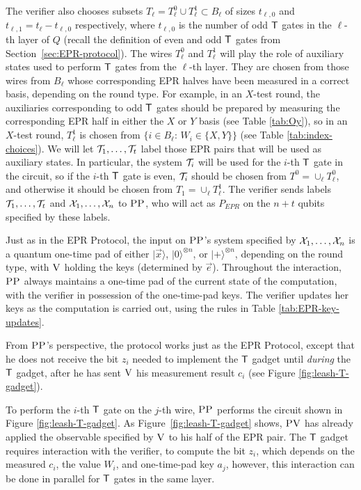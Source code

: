 \documentclass[11pt,letter]{article}
\theoremstyle{remark}
\theoremstyle{definition}
\newcommand{\ket}[1]{|#1\rangle}
\newcommand{\ver}{\textsc{V}}
\newcommand{\pv}{\textsc{PV}}
\newcommand{\pp}{\textsc{PP}}
\begin{document}
The verifier also chooses subsets $T_\ell = T_\ell^0 \cup T_\ell^1 \subset B_\ell$ of sizes $t_{\ell,0}$ and $t_{\ell,1} = t_\ell-t_{\ell,0}$ respectively, where $t_{\ell,0}$ is the number of odd $\sf T$ gates in the $\ell$-th layer of $Q$ (recall the definition of even and odd $\sf T$ gates from Section~\ref{sec:EPR-protocol}). The wires $T^0_\ell$ and $T^1_\ell$ will play the role of auxiliary states used to perform $\sf T$ gates from the $\ell$-th layer. They are chosen from those wires from $B_\ell$ whose corresponding EPR halves have been measured in a correct basis, depending on the round type.  For example, in an $X$-test round, the auxiliaries corresponding to odd $\sf T$ gates should be prepared by measuring the corresponding EPR half in either the $X$ or $Y$ basis (see Table \ref{tab:Oy}), so in an $X$-test round, $T_\ell^1$ is chosen from $\{i\in B_\ell:\,W_i\in \{X,Y\}\}$ (see Table \ref{tab:index-choices}). We will let ${\cal T}_1,\dots,{\cal T}_t$ label those EPR pairs that will be used as auxiliary states. In particular, the system ${\cal T}_i$ will be used for the $i$-th $\sf T$ gate in the circuit, so if the $i$-th $\sf T$ gate is even, ${\cal T}_i$ should be chosen from $T^0=\cup_\ell T_\ell^0$, and otherwise it should be chosen from $T_1=\cup_\ell T_\ell^1$. The verifier sends labels ${\cal T}_1,\dots,{\cal T}_t$ and ${\cal X}_1,\dots,{\cal X}_n$ to $\pp$, who will act as $P_{EPR}$ on the $n+t$ qubits specified by these labels.


Just as in the EPR Protocol, the input on $\pp$'s system specified by ${\cal X}_1,\dots,{\cal X}_n$ is a quantum one-time pad of either $\ket{\vec{x}}$, $\ket{0}^{\otimes n}$, or $\ket{+}^{\otimes n}$, depending on the round type, with $\ver$ holding the keys (determined by $\vec{e}$). Throughout the interaction, $\pp$ always maintains a one-time pad of the current state of the computation, with the verifier in possession of the one-time-pad keys. The verifier updates her keys as the computation is carried out, using the rules in Table \ref{tab:EPR-key-updates}. 




From $\pp$'s perspective, the protocol works just as the EPR Protocol, except that he does not receive the bit $z_i$ needed to implement the $\sf T$ gadget until \emph{during} the $\sf T$ gadget, after he has sent $\ver$ his measurement result $c_i$ (see Figure \ref{fig:leash-T-gadget}).


 
To perform the $i$-th $\sf T$ gate on the $j$-th wire, $\pp$ performs the circuit shown in Figure \ref{fig:leash-T-gadget}. As Figure~\ref{fig:leash-T-gadget} shows, $\pv$ has already applied the observable specified by $\ver$ to his half of the EPR pair. The $\sf T$ gadget requires interaction with the verifier, to compute the bit $z_i$, which depends on the measured $c_i$, the value $W_i$, and one-time-pad key $a_j$, however, this interaction can be done in parallel for $\sf T$ gates in the same layer. 
\end{document}
